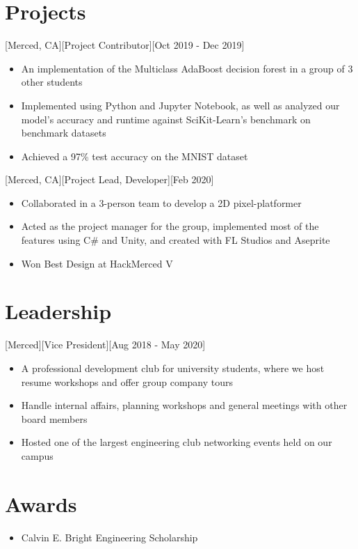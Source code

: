 \documentclass{article}
\begin{document}
\section{Projects}
[Merced, CA][Project Contributor][Oct 2019 - Dec 2019]
\begin{itemize}
  \item An implementation of the Multiclass AdaBoost decision forest in a group of 3 other students
  \item Implemented using Python and Jupyter Notebook, as well as analyzed our model's accuracy and runtime against SciKit-Learn's benchmark on benchmark datasets
  \item Achieved a 97\% test accuracy on the MNIST dataset
\end{itemize}
[Merced, CA][Project Lead, Developer][Feb 2020]
\begin{itemize}
  \item Collaborated in a 3-person team to develop a 2D pixel-platformer
  \item Acted as the project manager for the group, implemented most of the features using C\# and Unity, and created with FL Studios and Aseprite
  \item Won Best Design at HackMerced V
\end{itemize}

\section{Leadership}
[Merced][Vice President][Aug 2018 - May 2020]
\begin{itemize}
  \item A professional development club for university students, where we host resume workshops and offer group company tours
  \item Handle internal affairs, planning workshops and general meetings with other board members
  \item Hosted one of the largest engineering club networking events held on our campus
\end{itemize}

\section{Awards}
\begin{itemize}
  \item Calvin E. Bright Engineering Scholarship
\end{itemize}
\end{document}
